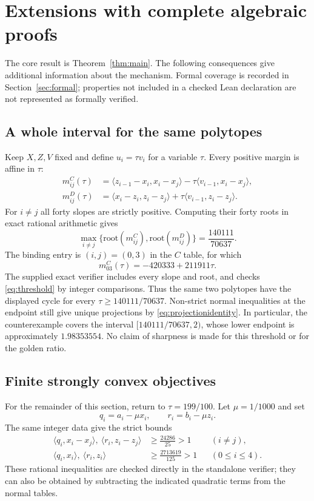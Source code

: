 \documentclass[11pt,a4paper]{article}
\theoremstyle{remark}
\newcommand{\ip}[2]{\langle #1,#2\rangle}
\begin{document}
\section{Extensions with complete algebraic proofs}
The core result is Theorem~\ref{thm:main}. The following consequences give additional information about the mechanism. Formal coverage is recorded in Section~\ref{sec:formal}; properties not included in a checked Lean declaration are not represented as formally verified.

\subsection{A whole interval for the same polytopes}
Keep $X,Z,V$ fixed and define $u_i=\tau v_i$ for a variable $\tau$. Every positive margin is affine in $\tau$:
\begin{align*}
m^C_{ij}(\tau)&=\ip{z_{i-1}-x_i}{x_i-x_j}
-\tau\ip{v_{i-1}}{x_i-x_j},\\
m^D_{ij}(\tau)&=\ip{x_i-z_i}{z_i-z_j}
+\tau\ip{v_{i-1}}{z_i-z_j}.
\end{align*}
For $i\ne j$ all forty slopes are strictly positive. Computing their forty roots in exact rational arithmetic gives
\begin{equation}\label{eq:threshold}
\max_{i\ne j}\{\text{root}(m^C_{ij}),\text{root}(m^D_{ij})\}
=\frac{140111}{70637}.
\end{equation}
The binding entry is $(i,j)=(0,3)$ in the $C$ table, for which
\[
m^C_{03}(\tau)=-420333+211911\tau.
\]
The supplied exact verifier includes every slope and root, and checks \eqref{eq:threshold} by integer comparisons. Thus the same two polytopes have the displayed cycle for every $\tau\ge140111/70637$. Non-strict normal inequalities at the endpoint still give unique projections by \eqref{eq:projectionidentity}. In particular, the counterexample covers the interval $[140111/70637,2)$, whose lower endpoint is approximately $1.98353554$. No claim of sharpness is made for this threshold or for the golden ratio.

\subsection{Finite strongly convex objectives}
For the remainder of this section, return to $\tau=199/100$. Let $\mu=1/1000$ and set
\[
q_i=a_i-\mu x_i,\qquad r_i=b_i-\mu z_i.
\]
The same integer data give the strict bounds
\begin{align}
\ip{q_i}{x_i-x_j},\ \ip{r_i}{z_i-z_j}
&\ge \frac{24286}{25}>1 &&(i\ne j),\label{eq:strongcross}\\
\ip{q_i}{x_i},\ \ip{r_i}{z_i}
&\ge \frac{2713619}{125}>1 &&(0\le i\le4).\label{eq:strongorigin}
\end{align}
These rational inequalities are checked directly in the standalone verifier; they can also be obtained by subtracting the indicated quadratic terms from the normal tables.
\end{document}
